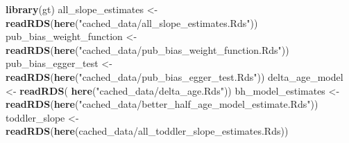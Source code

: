 \documentclass[
]{article}
\newenvironment{Shaded}{\begin{snugshade}}{\end{snugshade}}
\newcommand{\FunctionTok}[1]{\textcolor[rgb]{0.13,0.29,0.53}{\textbf{#1}}}
\newcommand{\NormalTok}[1]{#1}
\newcommand{\OtherTok}[1]{\textcolor[rgb]{0.56,0.35,0.01}{#1}}
\newcommand{\StringTok}[1]{\textcolor[rgb]{0.31,0.60,0.02}{#1}}
\begin{document}
\begin{Shaded}
\begin{Highlighting}[]
\FunctionTok{library}\NormalTok{(gt)}
\NormalTok{all\_slope\_estimates }\OtherTok{\textless{}{-}} \FunctionTok{readRDS}\NormalTok{(}\FunctionTok{here}\NormalTok{(}\StringTok{"cached\_data/all\_slope\_estimates.Rds"}\NormalTok{))}
\NormalTok{pub\_bias\_weight\_function }\OtherTok{\textless{}{-}} \FunctionTok{readRDS}\NormalTok{(}\FunctionTok{here}\NormalTok{(}\StringTok{"cached\_data/pub\_bias\_weight\_function.Rds"}\NormalTok{))}
\NormalTok{pub\_bias\_egger\_test }\OtherTok{\textless{}{-}} \FunctionTok{readRDS}\NormalTok{(}\FunctionTok{here}\NormalTok{(}\StringTok{"cached\_data/pub\_bias\_egger\_test.Rds"}\NormalTok{))}
\NormalTok{delta\_age\_model }\OtherTok{\textless{}{-}} \FunctionTok{readRDS}\NormalTok{( }\FunctionTok{here}\NormalTok{(}\StringTok{"cached\_data/delta\_age.Rds"}\NormalTok{))}
\NormalTok{bh\_model\_estimates }\OtherTok{\textless{}{-}} \FunctionTok{readRDS}\NormalTok{(}\FunctionTok{here}\NormalTok{(}\StringTok{"cached\_data/better\_half\_age\_model\_estimate.Rds"}\NormalTok{))}
\NormalTok{toddler\_slope }\OtherTok{\textless{}{-}} \FunctionTok{readRDS}\NormalTok{(}\FunctionTok{here}\NormalTok{(}\StringTok{\textquotesingle{}cached\_data/all\_toddler\_slope\_estimates.Rds\textquotesingle{}}\NormalTok{))}
\end{Highlighting}
\end{Shaded}
\end{document}
